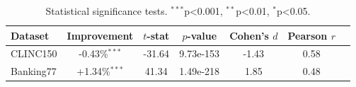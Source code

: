 \begin{table}[t]
\centering
\caption{Statistical significance tests. $^{***}$p<0.001, $^{**}$p<0.01, $^{*}$p<0.05.}
\label{tab:statistical_tests}
\begin{tabular}{lcccccc}
\toprule
Dataset & Improvement & $t$-stat & $p$-value & Cohen's $d$ & Pearson $r$ \\
\midrule
CLINC150 & -0.43\%$^{***}$ & -31.64 & 9.73e-153 & -1.43 & 0.58 \\
Banking77 & +1.34\%$^{***}$ & 41.34 & 1.49e-218 & 1.85 & 0.48 \\
\bottomrule
\end{tabular}
\end{table}